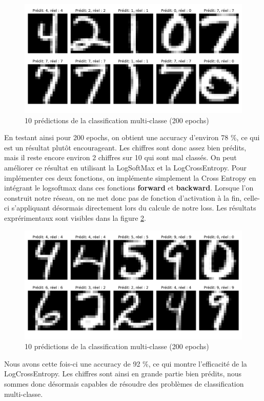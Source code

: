 \documentclass{article}
\begin{document}
\begin{figure}[H]
    \centering
    \includegraphics[width=0.8\linewidth]{Images/multi1.png}
    \caption{10 prédictions de la classification multi-classe (200 epochs)}
	\label{fig:multi1}
\end{figure}
En testant ainsi pour 200 epochs, on obtient une accuracy d'environ 78 \%, ce qui est un résultat plutôt encourageant. Les chiffres sont donc assez bien prédits, mais il reste encore environ 2 chiffres sur 10 qui sont mal classés. On peut améliorer ce résultat en utilisant la LogSoftMax et la LogCrossEntropy. Pour implémenter ces deux fonctions, on implémente simplement la Cross Entropy en intégrant le logsoftmax dans ces fonctions \textbf{forward} et \textbf{backward}. Lorsque l'on construit notre réseau, on ne met donc pas de fonction d'activation à la fin, celle-ci s'appliquant désormais directement lors du calcule de notre loss.
Les résultats exprérimentaux sont visibles dans la figure \ref{fig:multi2}.
\begin{figure}[H]
    \centering
    \includegraphics[width=0.8\linewidth]{Images/multi2.png}
    \caption{10 prédictions de la classification multi-classe (200 epochs)}
    \label{fig:multi2}
\end{figure}
Nous avons cette fois-ci une accuracy de 92 \%, ce qui montre l'efficacité de la LogCrossEntropy. Les chiffres sont ainsi en grande partie bien prédits, nous sommes donc désormais capables de résoudre des problèmes de classification multi-classe.
\end{document}
